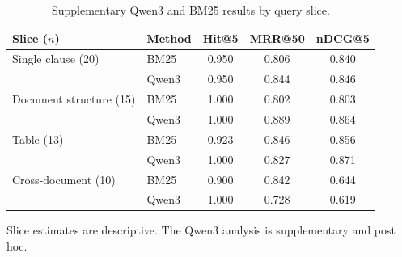 \begin{table}[htbp]
\centering
\begin{threeparttable}
\caption{Supplementary Qwen3 and BM25 results by query slice.}
\label{tab:qwen_slices}
\begin{tabular}{llccc}
\toprule
Slice ($n$) & Method & Hit@5 & MRR@50 & nDCG@5 \\
\midrule
Single clause (20) & BM25 & 0.950 & 0.806 & 0.840 \\
 & Qwen3 & 0.950 & 0.844 & 0.846 \\
Document structure (15) & BM25 & 1.000 & 0.802 & 0.803 \\
 & Qwen3 & 1.000 & 0.889 & 0.864 \\
Table (13) & BM25 & 0.923 & 0.846 & 0.856 \\
 & Qwen3 & 1.000 & 0.827 & 0.871 \\
Cross-document (10) & BM25 & 0.900 & 0.842 & 0.644 \\
 & Qwen3 & 1.000 & 0.728 & 0.619 \\
\bottomrule
\end{tabular}
\begin{tablenotes}[flushleft]\footnotesize
\item Slice estimates are descriptive. The Qwen3 analysis is supplementary and post hoc.
\end{tablenotes}
\end{threeparttable}
\end{table}
